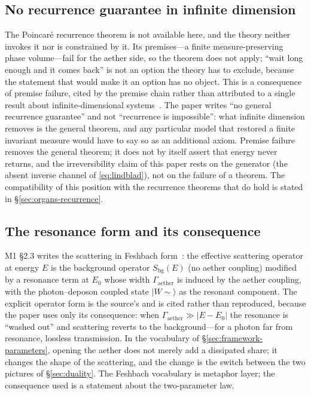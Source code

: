 \documentclass[11pt,a4paper]{article}
\begin{document}
\subsection{No recurrence guarantee in infinite dimension}
\label{sec:framework-recurrence}

The Poincar\'e recurrence theorem is not available here, and the theory neither invokes it nor is constrained by it. Its premises---a finite measure-preserving phase volume---fail for the aether side, so the theorem does not apply; ``wait long enough and it comes back'' is not an option the theory has to exclude, because the statement that would make it an option has no object. This is a consequence of premise failure, cited by the premise chain rather than attributed to a single result about infinite-dimensional systems~\cite{poincare1890,walters1982,bocchieri1957,wallace2015,caldeira1983}. The paper writes ``no general recurrence guarantee'' and not ``recurrence is impossible'': what infinite dimension removes is the general theorem, and any particular model that restored a finite invariant measure would have to say so as an additional axiom. Premise failure removes the general theorem; it does not by itself assert that energy never returns, and the irreversibility claim of this paper rests on the generator (the absent inverse channel of \eqref{eq:lindblad}), not on the failure of a theorem. The compatibility of this position with the recurrence theorems that do hold is stated in \S\ref{sec:organs-recurrence}.

\subsection{The resonance form and its consequence}
\label{sec:framework-resonance}

M1 §2.3 writes the scattering in Feshbach form~\cite{feshbach1958,feshbach1962,fano1961}: the effective scattering operator at energy $E$ is the background operator $S_{\mathrm{bg}}(E)$ (no aether coupling) modified by a resonance term at $E_0$ whose width $\Gamma_{\mathrm{aether}}$ is induced by the aether coupling, with the photon--deposon coupled state $\lvert W\!\sim\!\rangle$ as the resonant component. The explicit operator form is the source's and is cited rather than reproduced, because the paper uses only its consequence: when $\Gamma_{\mathrm{aether}} \gg \lvert E - E_0 \rvert$ the resonance is ``washed out'' and scattering reverts to the background---for a photon far from resonance, lossless transmission. In the vocabulary of \S\ref{sec:framework-parameters}, opening the aether does not merely add a dissipated share; it changes the shape of the scattering, and the change is the switch between the two pictures of \S\ref{sec:duality}. The Feshbach vocabulary is metaphor layer; the consequence used is a statement about the two-parameter law.
\end{document}
